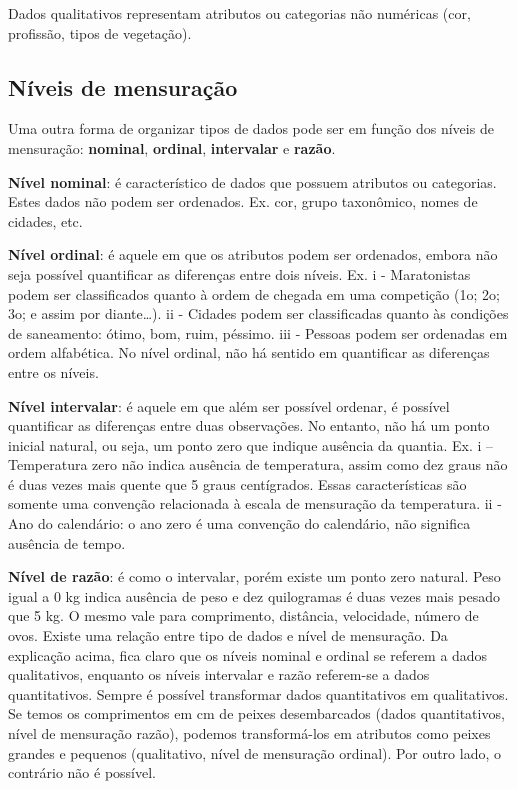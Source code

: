 \documentclass[
]{book}
\begin{document}
Dados qualitativos representam atributos ou categorias não numéricas (cor, profissão, tipos de vegetação).

\hypertarget{nuxedveis-de-mensurauxe7uxe3o-1}{%
\subsection{Níveis de mensuração}\label{nuxedveis-de-mensurauxe7uxe3o-1}}

Uma outra forma de organizar tipos de dados pode ser em função dos níveis de mensuração: \textbf{nominal}, \textbf{ordinal}, \textbf{intervalar} e \textbf{razão}.

\textbf{Nível nominal}: é característico de dados que possuem atributos ou categorias. Estes dados não podem ser ordenados. Ex. cor, grupo taxonômico, nomes de cidades, etc.

\textbf{Nível ordinal}: é aquele em que os atributos podem ser ordenados, embora não seja possível quantificar as diferenças entre dois níveis. Ex. i - Maratonistas podem ser classificados quanto à ordem de chegada em uma competição (1o; 2o; 3o; e assim por diante\ldots). ii - Cidades podem ser classificadas quanto às condições de saneamento: ótimo, bom, ruim, péssimo. iii - Pessoas podem ser ordenadas em ordem alfabética. No nível ordinal, não há sentido em quantificar as diferenças entre os níveis.

\textbf{Nível intervalar}: é aquele em que além ser possível ordenar, é possível quantificar as diferenças entre duas observações. No entanto, não há um ponto inicial natural, ou seja, um ponto zero que indique ausência da quantia. Ex. i -- Temperatura zero não indica ausência de temperatura, assim como dez graus não é duas vezes mais quente que 5 graus centígrados. Essas características são somente uma convenção relacionada à escala de mensuração da temperatura. ii - Ano do calendário: o ano zero é uma convenção do calendário, não significa ausência de tempo.

\textbf{Nível de razão}: é como o intervalar, porém existe um ponto zero natural. Peso igual a 0 kg indica ausência de peso e dez quilogramas é duas vezes mais pesado que 5 kg. O mesmo vale para comprimento, distância, velocidade, número de ovos. Existe uma relação entre tipo de dados e nível de mensuração. Da explicação acima, fica claro que os níveis nominal e ordinal se referem a dados qualitativos, enquanto os níveis intervalar e razão referem-se a dados quantitativos. Sempre é possível transformar dados quantitativos em qualitativos. Se temos os comprimentos em cm de peixes desembarcados (dados quantitativos, nível de mensuração razão), podemos transformá-los em atributos como peixes grandes e pequenos (qualitativo, nível de mensuração ordinal). Por outro lado, o contrário não é possível.
\end{document}
